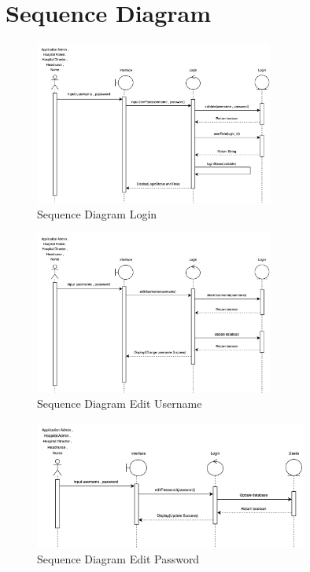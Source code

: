 \baselineskip=8mm
\renewcommand{\thesubsection}{\arabic{subsection}.}
\renewcommand{\theequation}{\thesection.\arabic{equation}}
\renewcommand{\thesection}{}
\renewcommand{\thesubsubsection}{\thesubsection\arabic{subsubsection}.}


\section{Sequence Diagram}

\vspace{1cm}



\begin{figure}[h]
    \centering
    \includegraphics[width=0.7\textwidth]{Sequence 1.1.png}
    \caption{Sequence Diagram Login}
    \end{figure}

\begin{figure}[h]
    \centering
    \includegraphics[width=0.7\textwidth]{Sequence 1.2.png}
    \caption{Sequence Diagram Edit Username}
    \end{figure}

\begin{figure}[h]
    \centering
    \includegraphics[width=0.8\textwidth]{Sequence 1.2.1.png}
    \caption{Sequence Diagram Edit Password}
\end{figure}

